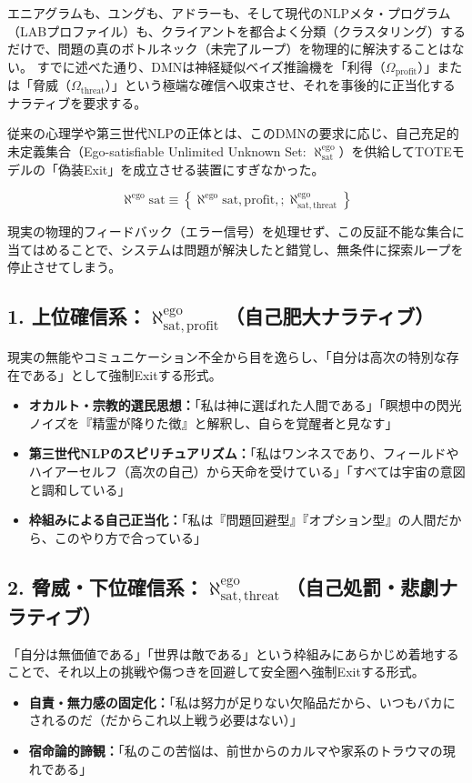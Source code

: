 エニアグラムも、ユングも、アドラーも、そして現代のNLPメタ・プログラム（LABプロファイル）も、クライアントを都合よく分類（クラスタリング）するだけで、問題の真のボトルネック（未完了ループ）を物理的に解決することはない。
すでに述べた通り、DMNは神経疑似ベイズ推論機を「利得（$\Omega_{\mathrm{profit}}$）」または「脅威（$\Omega_{\mathrm{threat}}$）」という極端な確信へ収束させ、それを事後的に正当化するナラティブを要求する。

従来の心理学や第三世代NLPの正体とは、このDMNの要求に応じ、自己充足的未定義集合（Ego-satisfiable Unlimited Unknown Set: $\aleph^{\mathrm{ego}}_{\mathrm{sat}}$）を供給してTOTEモデルの「偽装Exit」を成立させる装置にすぎなかった。

\begin{equation}
\aleph^{\mathrm{ego}}{\mathrm{sat}} \equiv \left\{ \aleph^{\mathrm{ego}}{\mathrm{sat}, \mathrm{profit}}, ; \aleph^{\mathrm{ego}}_{\mathrm{sat}, \mathrm{threat}} \right\}
\end{equation}

現実の物理的フィードバック（エラー信号）を処理せず、この反証不能な集合に当てはめることで、システムは問題が解決したと錯覚し、無条件に探索ループを停止させてしまう。

\subsection*{1. 上位確信系：$\aleph^{\mathrm{ego}}_{\mathrm{sat}, \mathrm{profit}}$（自己肥大ナラティブ）}
現実の無能やコミュニケーション不全から目を逸らし、「自分は高次の特別な存在である」として強制Exitする形式。
\begin{itemize}
\item \textbf{オカルト・宗教的選民思想：}「私は神に選ばれた人間である」「瞑想中の閃光ノイズを『精霊が降りた徴』と解釈し、自らを覚醒者と見なす」
\item \textbf{第三世代NLPのスピリチュアリズム：}「私はワンネスであり、フィールドやハイアーセルフ（高次の自己）から天命を受けている」「すべては宇宙の意図と調和している」
\item \textbf{枠組みによる自己正当化：}「私は『問題回避型』『オプション型』の人間だから、このやり方で合っている」
\end{itemize}

\subsection*{2. 脅威・下位確信系：$\aleph^{\mathrm{ego}}_{\mathrm{sat}, \mathrm{threat}}$（自己処罰・悲劇ナラティブ）}
「自分は無価値である」「世界は敵である」という枠組みにあらかじめ着地することで、それ以上の挑戦や傷つきを回避して安全圏へ強制Exitする形式。
\begin{itemize}
\item \textbf{自責・無力感の固定化：}「私は努力が足りない欠陥品だから、いつもバカにされるのだ（だからこれ以上戦う必要はない）」
\item \textbf{宿命論的諦観：}「私のこの苦悩は、前世からのカルマや家系のトラウマの現れである」
\end{itemize}


